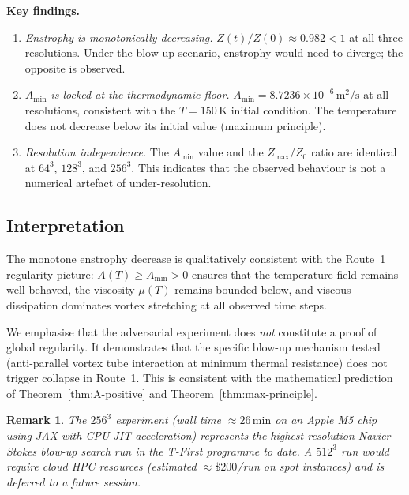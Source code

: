 \documentclass[12pt]{article}
\newtheorem{remark}[theorem]{Remark}
\newcommand{\Amin}{A_{\min}}
\begin{document}
\textbf{Key findings.}
\begin{enumerate}[label=(\roman*)]
  \item \emph{Enstrophy is monotonically decreasing.}  $Z(t)/Z(0) \approx 0.982 < 1$
    at all three resolutions.  Under the blow-up scenario, enstrophy would need to
    diverge; the opposite is observed.
  \item \emph{$\Amin$ is locked at the thermodynamic floor.}
    $\Amin = 8.7236\times10^{-6}\,\mathrm{m}^2/\mathrm{s}$ at all resolutions,
    consistent with the $T = 150\,\mathrm{K}$ initial condition.  The temperature
    does not decrease below its initial value (maximum principle).
  \item \emph{Resolution independence.}  The $\Amin$ value and the $Z_{\max}/Z_0$
    ratio are identical at $64^3$, $128^3$, and $256^3$.  This indicates that the
    observed behaviour is not a numerical artefact of under-resolution.
\end{enumerate}

\subsection{Interpretation}
\label{ssec:blowup-interp}

The monotone enstrophy decrease is qualitatively consistent with the Route~1
regularity picture: $A(T) \geq A_{\min} > 0$ ensures that the temperature field
remains well-behaved, the viscosity $\mu(T)$ remains bounded below, and viscous
dissipation dominates vortex stretching at all observed time steps.

We emphasise that the adversarial experiment does \emph{not} constitute a proof of
global regularity.  It demonstrates that the specific blow-up mechanism tested
(anti-parallel vortex tube interaction at minimum thermal resistance) does not
trigger collapse in Route~1.  This is consistent with the mathematical prediction
of Theorem~\ref{thm:A-positive} and Theorem~\ref{thm:max-principle}.

\begin{remark}
  The $256^3$ experiment (wall time $\approx 26\,\mathrm{min}$ on an Apple M5 chip
  using JAX with CPU-JIT acceleration) represents the highest-resolution
  Navier-Stokes blow-up search run in the T-First programme to date.  A $512^3$
  run would require cloud HPC resources (estimated $\approx \$200$/run on spot
  instances) and is deferred to a future session.
\end{remark}

\end{document}

